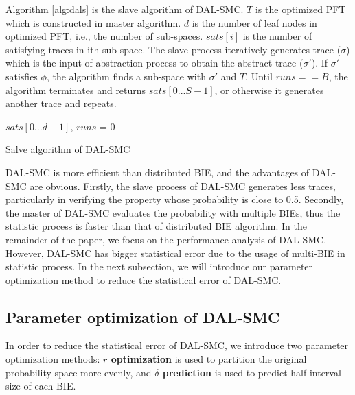 Algorithm \ref{alg:dals} is the slave algorithm of DAL-SMC. $T$ is the optimized PFT which is constructed in master algorithm. $d$ is the number of leaf nodes in optimized PFT, i.e., the number of sub-spaces. $sats[i]$ is the number of satisfying traces in ith sub-space. The slave process iteratively generates trace ($\sigma$) which is the input of abstraction process to obtain the abstract trace ($\sigma'$). If $\sigma'$ satisfies $\phi$, the algorithm finds a sub-space with $\sigma'$ and $T$. Until $runs == B$, the algorithm terminates and returns $sats[0...S-1]$, or otherwise it generates another trace and repeats.

\begin{algorithm}[t]
{}
$sats[0...d-1]$, $runs$ = 0\;
\caption{Salve algorithm of DAL-SMC}
\label{alg:dals}
\end{algorithm}


DAL-SMC is more efficient than distributed BIE, and the advantages of DAL-SMC are obvious. Firstly, the slave process of DAL-SMC generates less traces, particularly in verifying the property whose probability is close to 0.5. Secondly, the master of DAL-SMC evaluates the probability with multiple BIEs, thus the statistic process is faster than that of distributed BIE algorithm. In the remainder of the paper, we focus on the performance analysis of DAL-SMC. However, DAL-SMC has bigger statistical error due to the usage of multi-BIE in statistic process. In the next subsection, we will introduce our parameter optimization method to reduce the statistical error of DAL-SMC. 


\subsection{Parameter optimization of DAL-SMC}
In order to reduce the statistical error of DAL-SMC, we introduce two parameter optimization methods: \textbf{$r$ optimization} is used to partition the original probability space more evenly, and \textbf{$\delta$ prediction} is used to predict half-interval size of each BIE.

